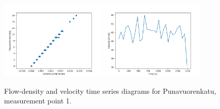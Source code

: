 \documentclass[english, 12pt, a4paper, elec, utf8, pdfa, online]{aaltothesis}
\begin{document}
\begin{figure}[ht!]
    \centering
    \includegraphics[width=0.45\textwidth]{graphs/Punavuorenkatu_1_flw_dns.png}
    \includegraphics[width=0.45\textwidth]{graphs/Punavuorenkatu_1_spd_time_6.png}
    \caption{Flow-density and velocity time series diagrams for Punavuorenkatu, measurement point 1.}
\end{figure}
\end{document}
